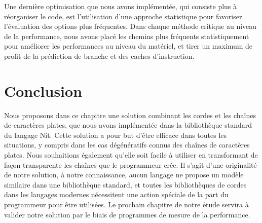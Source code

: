 Une dernière optimisation que nous avons implémentée, 
qui consiste plus à réorganiser le code, est l'utilisation d'une approche statistique pour
favoriser l'évaluation des options plus fréquentes. Dans chaque méthode critique au niveau de la performance,
nous avons placé les chemins plus fréquents statistiquement pour améliorer les performances au niveau du
matériel, et tirer un maximum de profit de la prédiction de branche et des caches d'instruction.

\section{Conclusion}

Nous proposons dans ce chapitre une solution combinant les cordes et les
chaînes de caractères plates, que nous avons implémentée dans la bibliothèque standard du langage Nit.
Cette solution a pour but d'être efficace dans toutes les situations, y compris dans les cas dégénératifs connus des
chaînes de caractères plates.
Nous souhaitions également qu'elle soit facile à utiliser en transformant de façon transparente les chaînes que
le programmeur crée.
Il s'agit d'une originalité de notre solution, à notre connaissance, aucun langage ne propose un modèle
similaire dans une bibliothèque standard, et toutes les bibliothèques de cordes dans les
langages modernes nécessitent une action spéciale de la part du programmeur pour être utilisées.
Le prochain chapitre de notre étude servira à valider notre solution par le biais de
programmes de mesure de la performance.
